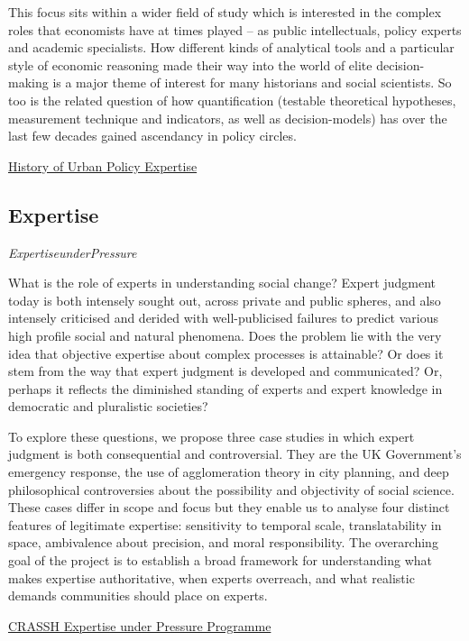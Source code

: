 \documentclass[
]{book}
\begin{document}
This focus sits within a wider field of study which is interested in the complex roles that economists have at times played -- as public intellectuals, policy experts and academic specialists. How different kinds of analytical tools and a particular style of economic reasoning made their way into the world of elite decision-making is a major theme of interest for many historians and social scientists. So too is the related question of how quantification (testable theoretical hypotheses, measurement technique and indicators, as well as decision-models) has over the last few decades gained ascendancy in policy circles.

\href{https://hscif.org/economists-in-the-city-intro/}{History of Urban Policy Expertise}

\hypertarget{expertise}{%
\subsection{Expertise}\label{expertise}}

\emph{ExpertiseunderPressure}

What is the role of experts in understanding social change? Expert judgment today is both intensely sought out, across private and public spheres, and also intensely criticised and derided with well-publicised failures to predict various high profile social and natural phenomena. Does the problem lie with the very idea that objective expertise about complex processes is attainable? Or does it stem from the way that expert judgment is developed and communicated? Or, perhaps it reflects the diminished standing of experts and expert knowledge in democratic and pluralistic societies?

To explore these questions, we propose three case studies in which expert judgment is both consequential and controversial. They are the UK Government's emergency response, the use of agglomeration theory in city planning, and deep philosophical controversies about the possibility and objectivity of social science. These cases differ in scope and focus but they enable us to analyse four distinct features of legitimate expertise: sensitivity to temporal scale, translatability in space, ambivalence about precision, and moral responsibility. The overarching goal of the project is to establish a broad framework for understanding what makes expertise authoritative, when experts overreach, and what realistic demands communities should place on experts.

\href{http://www.crassh.cam.ac.uk/programmes/expertise-under-pressure}{CRASSH Expertise under Pressure Programme}
\end{document}
